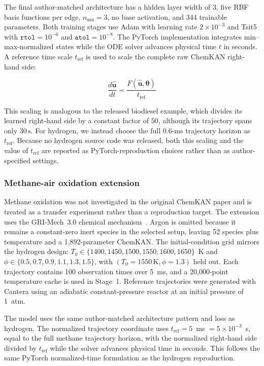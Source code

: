 \documentclass[11pt,a4paper]{article}
\begin{document}
The final author-matched architecture has a hidden layer width of \(3\), five RBF basis functions per edge, \(n_{\mathrm{mu}}=3\), no base activation, and 344 trainable parameters. Both training stages use Adam with learning rate \(2\times10^{-3}\) and Tsit5 with \(\texttt{rtol}=10^{-6}\) and \(\texttt{atol}=10^{-8}\). 
The PyTorch implementation integrates
min--max-normalized states while the ODE solver
advances physical time $t$ in seconds.
A reference time scale $t_{\mathrm{ref}}$ is
used to scale the complete raw ChemKAN
right-hand side:


\[
\frac{d\hat{\mathbf{u}}}{dt}
=
\frac{
F(\hat{\mathbf{u}},\boldsymbol{\theta})
}{
t_{\mathrm{ref}}
}
\]

This scaling is analogous to the released biodiesel example, which divides its
learned right-hand side by a constant factor of \(50\), although its trajectory
spans only \(30\,\mathrm{s}\). For hydrogen, we instead choose the full
\(0.6\)-ms trajectory horizon as \(t_{\mathrm{ref}}\). Because no hydrogen
source code was released, both this scaling and the value of
\(t_{\mathrm{ref}}\) are reported as PyTorch-reproduction choices rather than
as author-specified settings.

\subsubsection{Methane-air oxidation extension}

Methane oxidation was not investigated in the original ChemKAN paper and is treated as a transfer experiment rather than a reproduction target. The extension uses the GRI-Mech~3.0
chemical mechanism~\cite{GRIMech30}. Argon is omitted because it remains a constant-zero inert species in the selected setup, leaving 52 species plus temperature and a 1,892-parameter ChemKAN. The initial-condition grid mirrors the hydrogen design: $T_0\in\{1400,1450,1500,1550,1600,1650\}$~K and $\phi\in\{0.5,0.7,0.9,1.1,1.3,1.5\}$, with $(T_0=1550\,\mathrm{K},\phi=1.3)$ held out. Each trajectory contains 100 observation times over 5~ms, and a 20,000-point temperature cache is used in Stage~1. Reference trajectories were generated with Cantera using an adiabatic constant-pressure reactor at an initial pressure of 1~atm.

The model uses the same author-matched architecture pattern and loss as hydrogen. The normalized trajectory coordinate uses $t_{\mathrm{ref}}=5$~ms $=5\times10^{-3}$~s, equal to the full methane trajectory horizon, with the normalized right-hand side divided by $t_{\mathrm{ref}}$ while the solver advances physical time in seconds. This follows the same PyTorch normalized-time formulation as the hydrogen reproduction.
\end{document}
